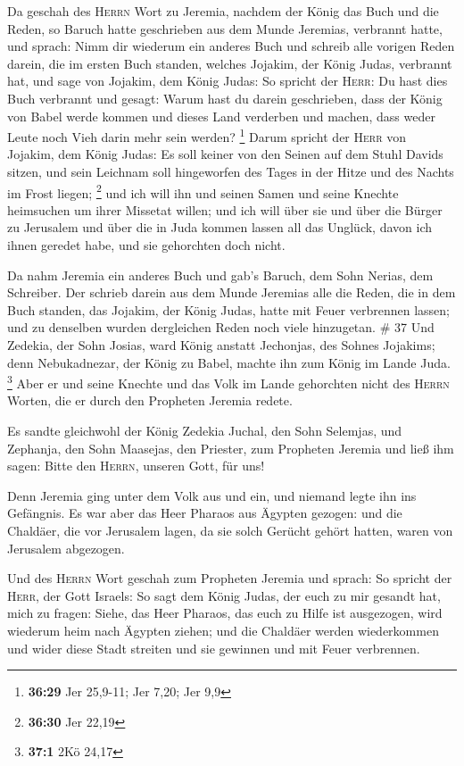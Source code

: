  Da geschah des \textsc{Herrn} Wort zu Jeremia, nachdem
der König das Buch und die Reden, so Baruch hatte geschrieben aus dem
Munde Jeremias, verbrannt hatte, und sprach:  Nimm dir
wiederum ein anderes Buch und schreib alle vorigen Reden darein, die im
ersten Buch standen, welches Jojakim, der König Judas, verbrannt hat,
 und sage von Jojakim, dem König Judas: So spricht der
\textsc{Herr}: Du hast dies Buch verbrannt und gesagt: Warum hast du
darein geschrieben, dass der König von Babel werde kommen und dieses
Land verderben und machen, dass weder Leute noch Vieh darin mehr sein
werden? \footnote{\textbf{36:29} Jer 25,9-11; Jer 7,20; Jer 9,9}
 Darum spricht der \textsc{Herr} von Jojakim, dem König
Judas: Es soll keiner von den Seinen auf dem Stuhl Davids sitzen, und
sein Leichnam soll hingeworfen des Tages in der Hitze und des Nachts im
Frost liegen; \footnote{\textbf{36:30} Jer 22,19}  und
ich will ihn und seinen Samen und seine Knechte heimsuchen um ihrer
Missetat willen; und ich will über sie und über die Bürger zu Jerusalem
und über die in Juda kommen lassen all das Unglück, davon ich ihnen
geredet habe, und sie gehorchten doch nicht.

 Da nahm Jeremia ein anderes Buch und gab's Baruch, dem
Sohn Nerias, dem Schreiber. Der schrieb darein aus dem Munde Jeremias
alle die Reden, die in dem Buch standen, das Jojakim, der König Judas,
hatte mit Feuer verbrennen lassen; und zu denselben wurden dergleichen
Reden noch viele hinzugetan. \# 37  Und Zedekia, der Sohn
Josias, ward König anstatt Jechonjas, des Sohnes Jojakims; denn
Nebukadnezar, der König zu Babel, machte ihn zum König im Lande Juda.
\footnote{\textbf{37:1} 2Kö 24,17}  Aber er und seine
Knechte und das Volk im Lande gehorchten nicht des \textsc{Herrn}
Worten, die er durch den Propheten Jeremia redete.

 Es sandte gleichwohl der König Zedekia Juchal, den Sohn
Selemjas, und Zephanja, den Sohn Maasejas, den Priester, zum Propheten
Jeremia und ließ ihm sagen: Bitte den \textsc{Herrn}, unseren Gott, für
uns!

 Denn Jeremia ging unter dem Volk aus und ein, und niemand
legte ihn ins Gefängnis.  Es war aber das Heer Pharaos aus
Ägypten gezogen: und die Chaldäer, die vor Jerusalem lagen, da sie solch
Gerücht gehört hatten, waren von Jerusalem abgezogen.

 Und des \textsc{Herrn} Wort geschah zum Propheten Jeremia
und sprach:  So spricht der \textsc{Herr}, der Gott
Israels: So sagt dem König Judas, der euch zu mir gesandt hat, mich zu
fragen: Siehe, das Heer Pharaos, das euch zu Hilfe ist ausgezogen, wird
wiederum heim nach Ägypten ziehen;  und die Chaldäer
werden wiederkommen und wider diese Stadt streiten und sie gewinnen und
mit Feuer verbrennen.

